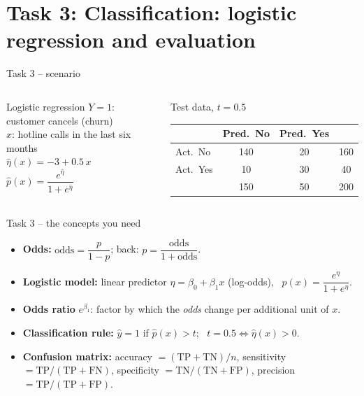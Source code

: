 \documentclass[aspectratio=169,11pt]{beamer}
\begin{document}
\section[Task 3]{Task 3: Classification: logistic regression and evaluation}

\begin{frame}{Task 3 -- scenario}
\begin{columns}[T]
    \begin{block}{Logistic regression}
      $Y = 1$: customer cancels (churn)\\
      $x$: hotline calls in the last six months\\[4pt]
      $\hat\eta(x) = -3 + 0.5\,x$\\[3pt]
      $\hat p(x) = \dfrac{e^{\hat\eta}}{1+e^{\hat\eta}}$
    \end{block}
    \begin{block}{Test data, $t = 0.5$}
      \begin{center}\small
      \begin{tabular}{l|cc|c}
        & Pred.\ No & Pred.\ Yes & \\
        \hline
        Act.\ No & 140 & 20 & 160\\
        Act.\ Yes & 10 & 30 & 40\\
        \hline
        & 150 & 50 & 200
      \end{tabular}
      \end{center}
    \end{block}
  \end{columns}
\end{frame}

\begin{frame}{Task 3 -- the concepts you need}
  \begin{itemize}\setlength{\itemsep}{3pt}
    \item \textbf{Odds:} $\text{odds} = \dfrac{p}{1-p}$; back: $p = \dfrac{\text{odds}}{1+\text{odds}}$.
    \item \textbf{Logistic model:} linear predictor $\eta = \beta_0 + \beta_1 x$ (log-odds), \ $p(x) = \dfrac{e^{\eta}}{1+e^{\eta}}$.
    \item \textbf{Odds ratio} $e^{\beta_1}$: factor by which the \emph{odds} change per additional unit of $x$.
    \item \textbf{Classification rule:} $\hat y = 1$ if $\hat p(x) > t$; \ $t = 0.5 \Leftrightarrow \hat\eta(x) > 0$.
    \item \textbf{Confusion matrix:} accuracy $= (\mathrm{TP}+\mathrm{TN})/n$, sensitivity $= \mathrm{TP}/(\mathrm{TP}+\mathrm{FN})$, specificity $= \mathrm{TN}/(\mathrm{TN}+\mathrm{FP})$, precision $= \mathrm{TP}/(\mathrm{TP}+\mathrm{FP})$.
  \end{itemize}
\end{frame}
\end{document}
